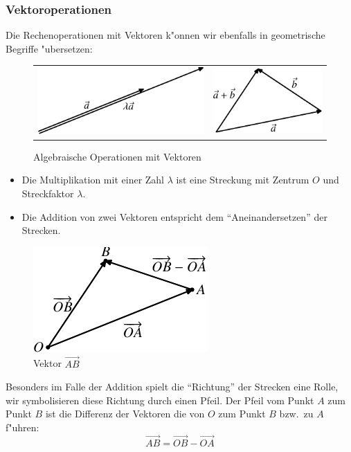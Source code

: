 \subsubsection{Vektoroperationen}
Die Rechenoperationen mit Vektoren k"onnen wir ebenfalls in geometrische
Begriffe "ubersetzen:
\begin{figure}
\begin{center}
\begin{tabular}{cc}
\includegraphics{images/v-2}&
\includegraphics{images/v-3}
\end{tabular}
\end{center}
\caption{Algebraische Operationen mit Vektoren\label{image-vektor-operationen}}
\end{figure}
\begin{itemize}
\item Die Multiplikation mit einer Zahl $\lambda$ ist eine Streckung mit
Zentrum $O$ und Streckfaktor $\lambda$.
\item Die Addition von zwei Vektoren entspricht dem ``Aneinandersetzen''
der Strecken.
\end{itemize}
\begin{figure}
\begin{center}
\includegraphics{images/v-4}
\end{center}
\caption{Vektor $\overset{\rightarrow}{AB}$
\label{image-vektorab}}
\end{figure}
Besonders im Falle der Addition spielt die ``Richtung'' der Strecken eine
Rolle, wir symbolisieren diese Richtung durch einen Pfeil.
Der Pfeil vom Punkt $A$ zum Punkt $B$ ist die Differenz der Vektoren die von
$O$ zum Punkt $B$ bzw.~zu $A$ f"uhren:
\[
\overset{\rightarrow}{AB}=\overset{\rightarrow}{OB}-\overset{\rightarrow}{OA}
\]

